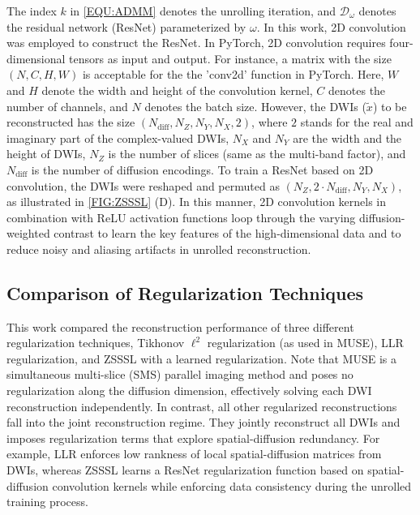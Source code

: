 \documentclass[journal,twoside,web]{ieeecolor}
\begin{document}
	The index $k$ in \cref{EQU:ADMM} denotes the unrolling iteration,
	and $\mathcal{D}_{\omega}$ denotes the residual network (ResNet) \cite{he_2016_resnet}
	parameterized by $\omega$.
	In this work, 2D convolution was employed to construct the ResNet.
	In PyTorch, 2D convolution requires four-dimensional tensors as input and output.
	For instance, a matrix with the size $(N, C, H, W)$ is acceptable
	for the the 'conv2d' function in PyTorch.
	Here, $W$ and $H$ denote the width and height of the convolution kernel,
	$C$ denotes the number of channels, and $N$ denotes the batch size.
	However, the DWIs ($\tilde{x}$) to be reconstructed
	has the size $(N_{\text{diff}}, N_Z, N_Y, N_X, 2)$,
	where $2$ stands for the real and imaginary part of the complex-valued DWIs,
	$N_X$ and $N_Y$ are the width and the height of DWIs,
	$N_Z$ is the number of slices (same as the multi-band factor), and
	$N_{\text{diff}}$ is the number of diffusion encodings.
	To train a ResNet based on 2D convolution, the DWIs were reshaped and permuted
	as $(N_Z, 2 \cdot N_{\text{diff}}, N_Y, N_X)$, as illustrated in \cref{FIG:ZSSSL} (D).
	In this manner, 2D convolution kernels in combination with ReLU activation functions
	loop through the varying diffusion-weighted contrast
	to learn the key features of the high-dimensional data and
	to reduce noisy and aliasing artifacts in unrolled reconstruction.

	\subsection{Comparison of Regularization Techniques}

	This work compared the reconstruction performance
	of three different regularization techniques,
	Tikhonov $\ell^2$ regularization (as used in MUSE),
	LLR regularization,
	and ZSSSL with a learned regularization.
	Note that MUSE is a simultaneous multi-slice (SMS) parallel imaging method
	and poses no regularization along the diffusion dimension,
	effectively solving each DWI reconstruction independently.
	In contrast, all other regularized reconstructions
	fall into the joint reconstruction regime.
	They jointly reconstruct all DWIs
	and imposes regularization terms that explore spatial-diffusion redundancy.
	For example, LLR enforces low rankness of 
	local spatial-diffusion matrices from DWIs,
	whereas ZSSSL learns a ResNet regularization function
	based on spatial-diffusion convolution kernels
	while enforcing data consistency during the unrolled training process.
\end{document}
